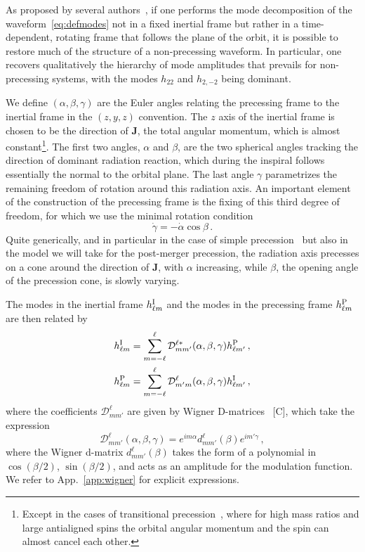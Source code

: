 \documentclass[aps,showpacs,twocolumn,
prd,superscriptaddress,nofootinbib]{revtex4-1}
\newcommand{\be}{\begin{equation}}
\newcommand{\ee}{\end{equation}}
\newcommand\calD{{\mathcal{D}}}
\newcommand{\SM}[1]{{\color{Red} #1}}
\begin{document}
As proposed by several authors~\cite{BCV03b, BCPTV05, Schmidt+10, OShaughnessy+11, Boyle+11}, if one performs the mode decomposition of the waveform~\eqref{eq:defmodes} not in a fixed inertial frame but rather in a time-dependent, rotating frame that follows the plane of the orbit, it is possible to restore much of the structure of a non-precessing waveform. In particular, one recovers qualitatively the hierarchy of mode amplitudes that prevails for non-precessing systems, with the modes $h_{22}$ and $h_{2,-2}$ being dominant.

We define $(\alpha, \beta, \gamma)$ are the Euler angles relating the precessing frame to the inertial frame in the $(z,y,z)$ convention. The $z$ axis of the inertial frame is chosen to be the direction of $\bm{J}$, the total angular momentum, which is almost constant\footnote{Except in the cases of transitional precession~\cite{Apostolatos+94}, where for high mass ratios and large antialigned spins the orbital angular momentum and the spin can almost cancel each other.}. The first two angles, $\alpha$ and $\beta$, are the two spherical angles tracking the direction of dominant radiation reaction, which during the inspiral follows essentially the normal to the orbital plane. The last angle $\gamma$ parametrizes the remaining freedom of rotation around this radiation axis. An important element of the construction of the precessing frame is the fixing of this third degree of freedom, for which we use the minimal rotation condition~\cite{Boyle+11}
\be\label{eq:gammadot}
	\dot{\gamma} = -\dot{\alpha}\cos \beta \,.
\ee
Quite generically, and in particular in the case of simple precession~\cite{Apostolatos+94, Kidder95} but also in the model we will take for the post-merger precession, the radiation axis precesses on a cone around the direction of $\bm{J}$, with $\alpha$ increasing, while $\beta$, the opening angle of the precession cone, is slowly varying.

The modes in the inertial frame $h_{\ell m}^{\rm I}$ and the modes in the precessing frame $h_{\ell m}^{\rm P}$ are then related by~\cite{Goldberg+67}
\begin{subequations}
\label{eq:wignerrot}
\begin{align}
	h_{\ell m}^{\rm I} = \sum\limits_{m=-\ell}^{\ell} \calD^{\ell *}_{mm'} (\alpha,\beta,\gamma) h_{\ell m'}^{\rm P} \,, \\
	h_{\ell m}^{\rm P} = \sum\limits_{m=-\ell}^{\ell} \calD^{\ell }_{m'm} (\alpha,\beta,\gamma) h_{\ell m'}^{\rm I} \,,
\end{align}
\end{subequations}
where the coefficients $\calD^{\ell}_{mm'}$ are given by Wigner D-matrices~\cite{} \SM{[C]}, which take the expression
\be\label{eq:defWignerD}
	\calD^{\ell}_{mm'} (\alpha, \beta, \gamma) = e^{im \alpha} d^{\ell}_{mm'}(\beta) e^{im' \gamma}\,,
\ee
where the Wigner d-matrix $d^{\ell}_{mm'}(\beta)$ takes the form of a polynomial in $\cos (\beta/2)$, $\sin (\beta/2)$, and acts as an amplitude for the modulation function. We refer to App.~\ref{app:wigner} for explicit expressions.
\end{document}
